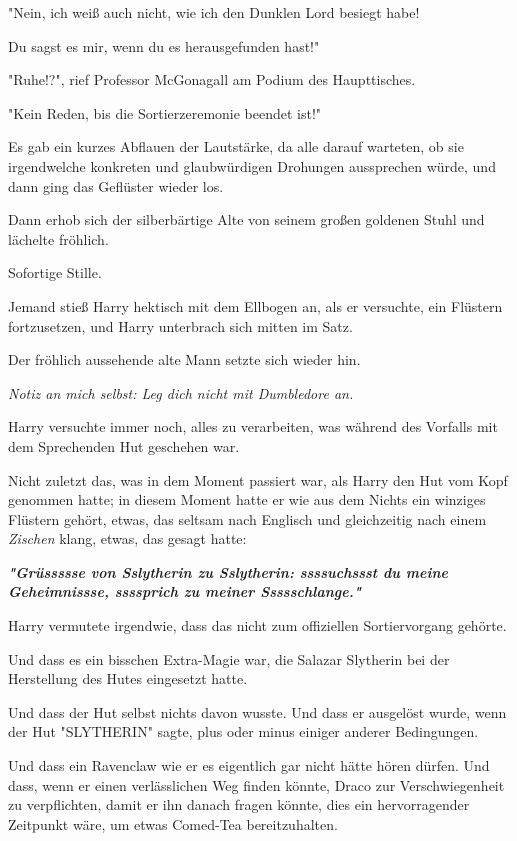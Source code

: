 {"Nein, ich weiß auch nicht, wie ich den Dunklen Lord besiegt habe!

Du sagst es mir, wenn du es herausgefunden hast!"

"Ruhe!?", rief Professor McGonagall am Podium des Haupttisches.

"Kein Reden, bis die Sortierzeremonie beendet ist!"

Es gab ein kurzes Abflauen der Lautstärke, da alle darauf warteten, ob sie irgendwelche konkreten und glaubwürdigen Drohungen aussprechen würde, und dann ging das Geflüster wieder los.

Dann erhob sich der silberbärtige Alte von seinem großen goldenen Stuhl und lächelte fröhlich.

Sofortige Stille.

Jemand stieß Harry hektisch mit dem Ellbogen an, als er versuchte, ein Flüstern fortzusetzen, und Harry unterbrach sich mitten im Satz.

Der fröhlich aussehende alte Mann setzte sich wieder hin.

\emph{Notiz an mich selbst: Leg dich nicht mit Dumbledore an.}

Harry versuchte immer noch, alles zu verarbeiten, was während des Vorfalls mit dem Sprechenden Hut geschehen war.

Nicht zuletzt das, was in dem Moment passiert war, als Harry den Hut vom Kopf genommen hatte; in diesem Moment hatte er wie aus dem Nichts ein winziges Flüstern gehört, etwas, das seltsam nach Englisch und gleichzeitig nach einem \emph{Zischen} klang, etwas, das gesagt hatte:

\textbf{\emph{"Grüssssse von Sslytherin zu Sslytherin: ssssuchssst du meine Geheimnissse, ssssprich zu meiner Ssssschlange."}}

Harry vermutete irgendwie, dass das nicht zum offiziellen Sortiervorgang gehörte.

Und dass es ein bisschen Extra-Magie war, die Salazar Slytherin bei der Herstellung des Hutes eingesetzt hatte.

Und dass der Hut selbst nichts davon wusste. Und dass er ausgelöst wurde, wenn der Hut "SLYTHERIN" sagte, plus oder minus einiger anderer Bedingungen.

Und dass ein Ravenclaw wie er es eigentlich gar nicht hätte hören dürfen. Und dass, wenn er einen verlässlichen Weg finden könnte, Draco zur Verschwiegenheit zu verpflichten, damit er ihn danach fragen könnte, dies ein hervorragender Zeitpunkt wäre, um etwas Comed-Tea bereitzuhalten.

}
